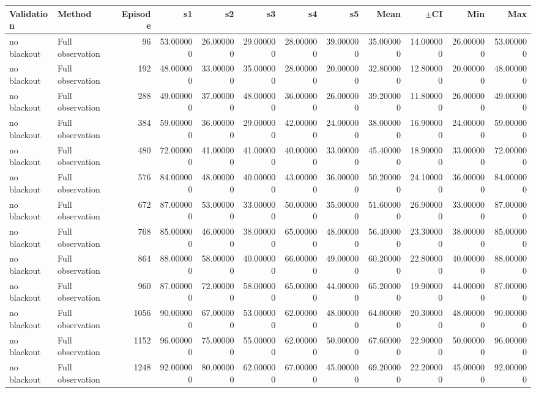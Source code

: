 \begin{tabular}{llrrrrrrrrrr}
\toprule
Validation & Method & Episode & s1 & s2 & s3 & s4 & s5 & Mean & $\pm$CI & Min & Max \\
\midrule
no blackout & Full observation & 96 & 53.000000 & 26.000000 & 29.000000 & 28.000000 & 39.000000 & 35.000000 & 14.000000 & 26.000000 & 53.000000 \\
no blackout & Full observation & 192 & 48.000000 & 33.000000 & 35.000000 & 28.000000 & 20.000000 & 32.800000 & 12.800000 & 20.000000 & 48.000000 \\
no blackout & Full observation & 288 & 49.000000 & 37.000000 & 48.000000 & 36.000000 & 26.000000 & 39.200000 & 11.800000 & 26.000000 & 49.000000 \\
no blackout & Full observation & 384 & 59.000000 & 36.000000 & 29.000000 & 42.000000 & 24.000000 & 38.000000 & 16.900000 & 24.000000 & 59.000000 \\
no blackout & Full observation & 480 & 72.000000 & 41.000000 & 41.000000 & 40.000000 & 33.000000 & 45.400000 & 18.900000 & 33.000000 & 72.000000 \\
no blackout & Full observation & 576 & 84.000000 & 48.000000 & 40.000000 & 43.000000 & 36.000000 & 50.200000 & 24.100000 & 36.000000 & 84.000000 \\
no blackout & Full observation & 672 & 87.000000 & 53.000000 & 33.000000 & 50.000000 & 35.000000 & 51.600000 & 26.900000 & 33.000000 & 87.000000 \\
no blackout & Full observation & 768 & 85.000000 & 46.000000 & 38.000000 & 65.000000 & 48.000000 & 56.400000 & 23.300000 & 38.000000 & 85.000000 \\
no blackout & Full observation & 864 & 88.000000 & 58.000000 & 40.000000 & 66.000000 & 49.000000 & 60.200000 & 22.800000 & 40.000000 & 88.000000 \\
no blackout & Full observation & 960 & 87.000000 & 72.000000 & 58.000000 & 65.000000 & 44.000000 & 65.200000 & 19.900000 & 44.000000 & 87.000000 \\
no blackout & Full observation & 1056 & 90.000000 & 67.000000 & 53.000000 & 62.000000 & 48.000000 & 64.000000 & 20.300000 & 48.000000 & 90.000000 \\
no blackout & Full observation & 1152 & 96.000000 & 75.000000 & 55.000000 & 62.000000 & 50.000000 & 67.600000 & 22.900000 & 50.000000 & 96.000000 \\
no blackout & Full observation & 1248 & 92.000000 & 80.000000 & 62.000000 & 67.000000 & 45.000000 & 69.200000 & 22.200000 & 45.000000 & 92.000000 \\

\end{tabular}
